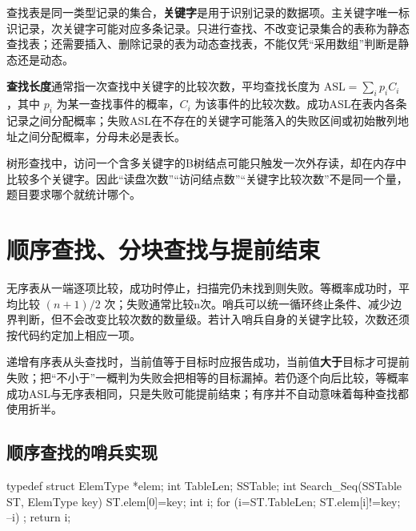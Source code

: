 \begin{definition}

查找表是同一类型记录的集合，\textbf{关键字}是用于识别记录的数据项。主关键字唯一标识记录，次关键字可能对应多条记录。只进行查找、不改变记录集合的表称为静态查找表；还需要插入、删除记录的表为动态查找表，不能仅凭``采用数组''判断是静态还是动态。

\end{definition}

\textbf{查找长度}通常指一次查找中关键字的比较次数，平均查找长度为 \(\mathrm{ASL}=\sum_i p_iC_i\)，其中 \(p_i\) 为某一查找事件的概率，\(C_i\) 为该事件的比较次数。成功ASL在表内各条记录之间分配概率；失败ASL在不存在的关键字可能落入的失败区间或初始散列地址之间分配概率，分母未必是表长。

树形查找中，访问一个含多关键字的B树结点可能只触发一次外存读，却在内存中比较多个关键字。因此``读盘次数''``访问结点数''``关键字比较次数''不是同一个量，题目要求哪个就统计哪个。

\section{顺序查找、分块查找与提前结束}\label{DS07-02}

无序表从一端逐项比较，成功时停止，扫描完仍未找到则失败。等概率成功时，平均比较 \((n+1)/2\) 次；失败通常比较n次。哨兵可以统一循环终止条件、减少边界判断，但不会改变比较次数的数量级。若计入哨兵自身的关键字比较，次数还须按代码约定加上相应一项。

递增有序表从头查找时，当前值等于目标时应报告成功，当前值\textbf{大于}目标才可提前失败；把``不小于''一概判为失败会把相等的目标漏掉。若仍逐个向后比较，等概率成功ASL与无序表相同，只是失败可能提前结束；有序并不自动意味着每种查找都使用折半。

\subsection{顺序查找的哨兵实现}\label{DS07-seq-code}

\par\medskip\noindent\begin{minipage}{\linewidth}
\begin{codeblock}[language=C++]
typedef struct {
    ElemType *elem;
    int TableLen;
} SSTable;
int Search_Seq(SSTable ST, ElemType key) {
    ST.elem[0]=key;
    int i;
    for (i=ST.TableLen; ST.elem[i]!=key; --i) ;
    return i;
}
\end{codeblock}
\end{minipage}\par\medskip

